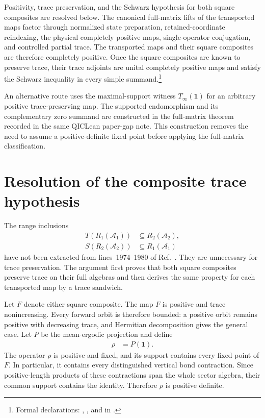 \documentclass{article}
\begin{document}
Positivity, trace preservation, and the Schwarz hypothesis for both square
composites are resolved below. The canonical full-matrix lifts of the
transported maps factor through normalized state preparation,
retained-coordinate reindexing, the physical completely positive maps,
single-operator conjugation, and controlled partial trace. The transported
maps and their square composites are therefore completely positive. Once the
square composites are known to preserve trace, their trace adjoints are
unital completely positive maps and satisfy the Schwarz inequality in every
simple summand.\footnote{Formal declarations:
,
, and
in .}

An alternative route uses the maximal-support witness
$T_\infty(\mathbf 1)$ for an arbitrary positive trace-preserving map. The
supported endomorphism and its complementary zero summand are constructed in
the full-matrix theorem recorded in the same QICLean paper-gap note. This
construction removes the need to assume a positive-definite fixed point before
applying the full-matrix classification.

\section{Resolution of the composite trace hypothesis}

The range inclusions
\begin{align}
    T(R_1(\mathcal A_1))
        &\subseteq R_2(\mathcal A_2),
    \label{eq:cpsv16_vertical_sector_invertibility_T_range_inclusion}\\
    S(R_2(\mathcal A_2))
        &\subseteq R_1(\mathcal A_1)
    \label{eq:cpsv16_vertical_sector_invertibility_S_range_inclusion}
\end{align}
have not been extracted from lines~1974--1980 of
Ref.~\cite{Cirac2016MPDO_arXiv}. They are unnecessary for trace preservation.
The argument first proves that both square composites preserve trace on their
full algebras and then derives the same property for each transported map by a
trace sandwich.

Let $F$ denote either square composite. The map $F$ is positive and trace
nonincreasing. Every forward orbit is therefore bounded: a positive orbit
remains positive with decreasing trace, and Hermitian decomposition gives the
general case. Let $P$ be the mean-ergodic projection and define
\begin{align}
    \rho
        &= P(\mathbf 1).
    \label{eq:cpsv16_vertical_sector_invertibility_ergodic_fixed_point}
\end{align}
The operator $\rho$ is positive and fixed, and its support contains every
fixed point of $F$. In particular, it contains every distinguished vertical
bond contraction. Since positive-length products of these contractions span
the whole sector algebra, their common support contains the identity.
Therefore $\rho$ is positive definite.
\end{document}
